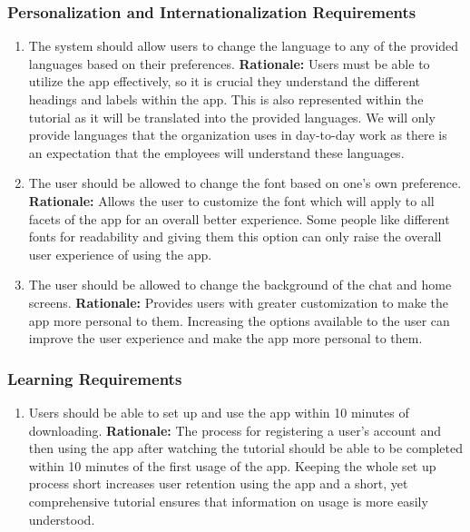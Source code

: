 \documentclass[]{article}
\begin{document}
\subsubsection{Personalization and Internationalization Requirements}
\label{ssub:personalization_and_internationalization_requirements}
\begin{enumerate}[{UH-PI}1. ]
	\item The system should allow users to change the language to any of the provided languages based on their preferences. \newline
	      \textbf{Rationale:} Users must be able to utilize the app effectively, so it is crucial they understand the different headings and labels within the app. This is also represented within the tutorial as it will be translated into the provided languages. We will only provide languages that the organization uses in day-to-day work as there is an expectation that the employees will understand these languages.
	\item The user should be allowed to change the font based on one’s own preference.  \newline
	      \textbf{Rationale:} Allows the user to customize the font which will apply to all facets of the app for an overall better experience. Some people like different fonts for readability and giving them this option can only raise the overall user experience of using the app.
	\item The user should be allowed to change the background of the chat and home screens. \newline
	      \textbf{Rationale:} Provides users with greater customization to make the app more personal to them. Increasing the options available to the user can improve the user experience and make the app more personal to them.
\end{enumerate}

\subsubsection{Learning Requirements}
\label{ssub:learning_requirements}
\begin{enumerate}[{UH-L}1. ]
	\item Users should be able to set up and use the app within 10 minutes of downloading. \newline
	      \textbf{Rationale:} The process for registering a user’s account and then using the app after watching the tutorial should be able to be completed within 10 minutes of the first usage of the app. Keeping the whole set up process short increases user retention using the app and a short, yet comprehensive tutorial ensures that information on usage is more easily understood.
\end{enumerate}
\end{document}
